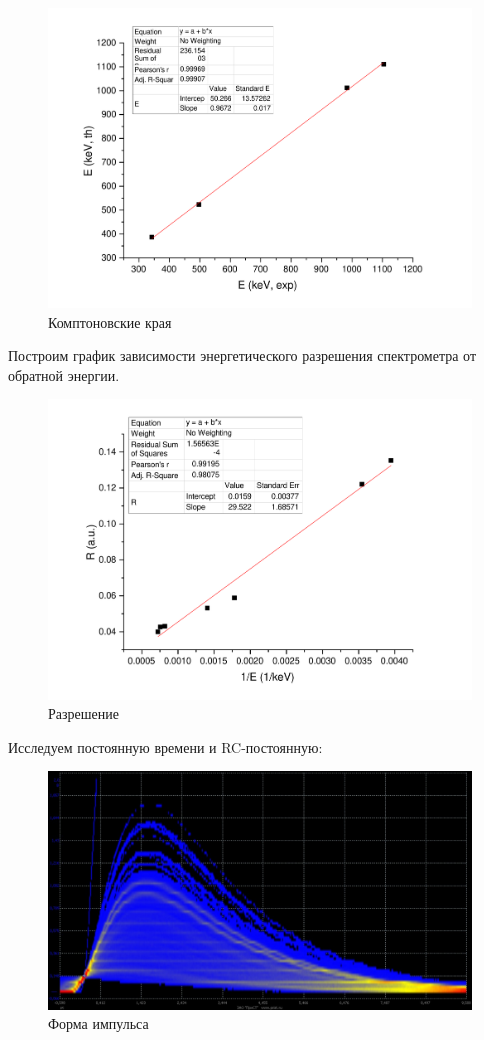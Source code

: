 \documentclass[a4paper,12pt]{article}
\begin{document}
	 \begin{figure}
	     \centering
	     \includegraphics[width=\linewidth]{komp.pdf}
	     \caption{Комптоновские края}
	     \label{fig:my_label}
	 \end{figure}
	 
	 Построим график зависимости энергетического разрешения спектрометра от обратной энергии.
	 
	 \begin{figure}
	     \centering
	     \includegraphics[width=0.8\linewidth]{res.pdf}
	     \caption{Разрешение}
	     \label{fig:my_label}
	 \end{figure}
	 
	 \pagebreak
	 
	 
	 Исследуем постоянную времени и RC-постоянную:
	 \begin{figure}[h!]
	     \centering
	     \includegraphics[width=0.8\linewidth]{co_resized}
	     \caption{Форма импульса}
	     \label{fig:my_label}
	 \end{figure}
	 
\end{document}
